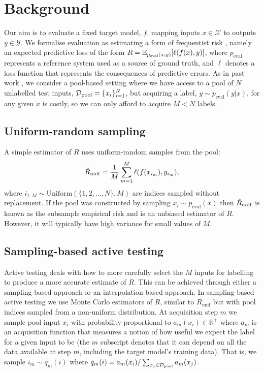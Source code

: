\section{Background}\label{sec:background}

Our aim is to evaluate a fixed target model, $f$, mapping inputs $x \in \mathcal{X}$ to outputs $y \in \mathcal{Y}$.
We formalise evaluation as estimating a form of frequentist risk \citep{berger1985statistical}, namely an expected predictive loss of the form $R = \mathbb{E}_{p_\mathrm{eval}(x,y)} \! \left[ \ell(f(x), y) \right]$, where $p_\mathrm{eval}$ represents a reference system used as a source of ground truth, and $\ell$ denotes a loss function that represents the consequences of predictive errors.
As in past work \citep{kossen2021active,kossen2022active}, we consider a pool-based setting \citep{lewis1994sequential} where we have access to a pool of $N$ unlabelled test inputs, $\mathcal{D}_\mathrm{pool} = \{x_i\}_{i=1}^N$, but acquiring a label, $y \sim p_\mathrm{eval}(y|x)$, for any given $x$ is costly, so we can only afford to acquire $M < N$ labels.


\subsection{Uniform-random sampling}

A simple estimator of $R$ uses uniform-random samples from the pool:
\begin{align*}
\hat{R}_\mathrm{unif} = \frac{1}{M} \sum_{m=1}^M \ell(f(x_{i_m}), y_{i_m})
,
\end{align*}
where $i_{1:M} \sim \mathrm{Uniform}(\{1, 2, \ldots, N\}, M)$ are indices sampled without replacement.
If the pool was constructed by sampling $x_i \sim p_\mathrm{eval}(x)$ then $\hat{R}_\mathrm{unif}$ is known as the subsample empirical risk and is an unbiased estimator of $R$. 
However, it will typically have high variance for small values of $M$.


\subsection{Sampling-based active testing}

Active testing deals with how to more carefully select the $M$ inputs for labelling to produce a more accurate estimate of $R$.
This can be achieved through either a sampling-based approach or an interpolation-based approach.
In sampling-based active testing we use Monte Carlo estimators of $R$, similar to $R_\mathrm{unif}$ but with pool indices sampled from a non-uniform distribution.
At acquisition step $m$ we sample pool input $x_i$ with probability proportional to $a_m(x_i) \in \mathbb{R}^+$ where $a_m$ is an acquisition function that measures a notion of how useful we expect the label for a given input to be (the $m$ subscript denotes that it can depend on all the data available at step $m$, including the target model's training data).
That is, we sample $i_m \sim q_m(i)$ where $q_m(i) = a_m(x_i) / \sum_{x_j\in\mathcal{D}_\mathrm{pool}} a_m(x_j)$.


